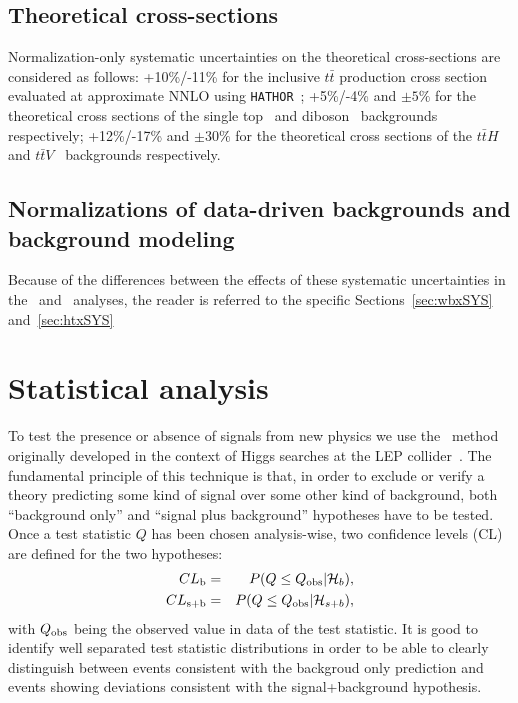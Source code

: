 \subsection{Theoretical cross-sections}
\label{sec:syst_bkgxsect}

Normalization-only systematic uncertainties on the theoretical
cross-sections are considered as follows:
+10\%/-11\% for the inclusive $t\bar{t}$
production cross section evaluated at approximate NNLO using 
\texttt{HATHOR}~\cite{ttbarxs}; +5\%/-4\% and $\pm 5\%$ 
for the theoretical cross sections of the single
top~\cite{stopxs,stopxs_2} and diboson~\cite{dibosonxs} backgrounds
respectively; +12\%/-17\% and  $\pm 30\%$ 
for the theoretical cross sections of the $t\bar{t}H$~\cite{lhcxs} and 
$t\bar{t}V$~\cite{ttbarVxs1,ttbarVxs2} backgrounds respectively.


\subsection{Normalizations of data-driven backgrounds and background modeling}
\label{sec:syst_norm}

Because of the differences between the effects of these systematic uncertainties
in the \wbx\ and \htx\ analyses, the reader is referred to the specific 
Sections~\ref{sec:wbxSYS} and~\ref{sec:htxSYS}


%
%


\section{Statistical analysis}\label{sec:cls}

To test the presence or absence of signals from new physics we use the
\ method~\cite{cls,cls_2} originally developed in the context of Higgs
searches at the LEP collider~\cite{Read:451614}.
The fundamental principle of this technique is that, in order to 
exclude or verify a theory predicting some kind of signal over some other kind
of background, both ``background only'' and ``signal plus background''
hypotheses have to be tested. Once a test statistic $Q$ has been chosen
analysis-wise, two confidence levels (CL) are defined for the two hypotheses:
\begin{eqnarray}\label{eq:clbclsb}
\cls{b} &=& P(Q \leq Q_{\rm obs}|\mathcal{H}_{b}),\\
\cls{s+b} &=& P(Q \leq Q_{\rm obs}|\mathcal{H}_{s+b}),
\end{eqnarray}
with $Q_{\rm obs}$ being the observed value in data of the 
test statistic. It is good to identify well separated test statistic
distributions in order to be able to clearly distinguish between 
events consistent with the backgroud only prediction and events
showing deviations consistent with the signal+background hypothesis.

